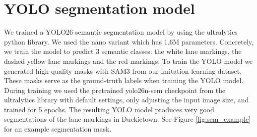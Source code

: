 \section{YOLO segmentation model}
\label{sec:yolo}

We trained a YOLO26 \cite{jocher2026ultralyticsyolo26unifiedrealtime} semantic segmentation model by using the ultralytics python library. We used the nano variant which has 1.6M parameters.
Concretely, we train the model to predict 3 semantic classes: the white lane markings, the dashed yellow lane markings and the red markings.
To train the YOLO model we generated high-quality masks with SAM3 \cite{carion2026sam} from our imitation learning dataset.
These masks serve as the ground-truth labels when training the YOLO model.
During training we used the pretrained yolo26n-sem checkpoint from the ultralytics library with default settings, only adjusting the input image size, and trained for 5 epochs.
The resulting YOLO model produces very good segmentations of the lane markings in Duckietown.
See Figure \ref{fig:sem_example} for an example segmentation mask.
